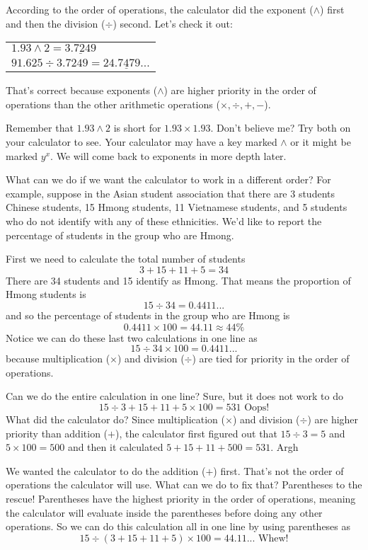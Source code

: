 According to the order of operations, the calculator did the exponent ($\land$) first and then the division ($\div$) second.  Let's check it out:
\begin{center}
\begin{tabular} {l}
$1.93 \land 2 =\underline{3.7249}$ \\
$91.625 \div 3.7249=\underline{24.7479...}$ \\
\end{tabular}
\end{center}
That's correct because exponents ($\land$) are higher priority in the order of operations than the other arithmetic operations ($\times, \div, +, -$).

Remember that $1.93 \land 2$ is short for $1.93\times 1.93$.  Don't believe me?  Try both on your calculator to see.  Your calculator may have a key marked $\land$ or it might be marked $y^x$.  We will come back to exponents in more depth later.

What can we do if we want the calculator to work in a different order? For example, suppose in the Asian student association that there are 3 students Chinese students, 15 Hmong students, 11 Vietnamese students, and 5 students who do not identify with any of these ethnicities.  We'd like to report the percentage of students in the group who are Hmong.

First we need to calculate the total number of students
$$3+15+11+5 = 34$$
There are 34 students and 15 identify as Hmong.  That means the proportion of Hmong students is
$$15 \div 34 = 0.4411...$$
and so the percentage of students in the group who are Hmong is
$$0.4411 \times 100 = 44.11 \approx 44 \%$$
Notice we can do these last two calculations in one line as
$$15 \div 34 \times 100 = 0.4411... $$
because multiplication ($\times$) and division ($\div$) are tied for priority in the order of operations.  

Can we do the entire calculation in one line?  Sure, but it does not work to do
$$15 \div 3 + 15 + 11 + 5 \times 100=531 \text{ Oops!}$$
What did the calculator do? Since multiplication ($\times$) and division ($\div$) are higher priority than addition ($+$), the calculator first figured out that $15\div 3 = 5$ and $5 \times 100 = 500$ and then it calculated $5 + 15 + 11 + 500 = 531$.  Argh

We wanted the calculator to do the addition ($+$) first.  That's not the order of operations the calculator will use.  What can we do to fix that?  Parentheses to the rescue!  Parentheses have the highest priority in the order of operations, meaning the calculator will evaluate inside the parentheses before doing any other operations.  So we can do this calculation all in one line by using parentheses as
$$15 \div (3 + 15 + 11 + 5) \times 100= 44.11... \text{ Whew!}$$

